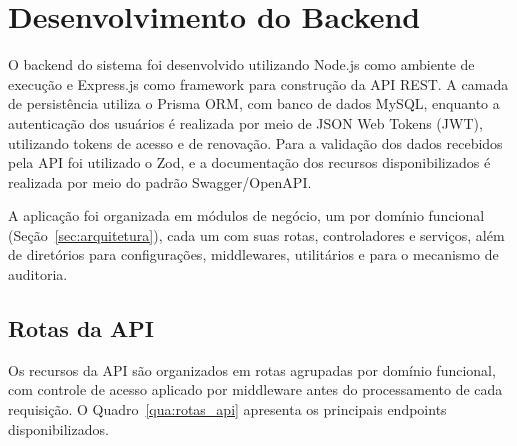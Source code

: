 \section{Desenvolvimento do Backend}\label{sec:backend}

O backend do sistema foi desenvolvido utilizando Node.js como ambiente de execução e Express.js como framework para construção da API REST. A camada de persistência utiliza o Prisma ORM, com banco de dados MySQL, enquanto a autenticação dos usuários é realizada por meio de JSON Web Tokens (JWT), utilizando tokens de acesso e de renovação. Para a validação dos dados recebidos pela API foi utilizado o Zod, e a documentação dos recursos disponibilizados é realizada por meio do padrão Swagger/OpenAPI.

A aplicação foi organizada em módulos de negócio, um por domínio funcional (Seção~\ref{sec:arquitetura}), cada um com suas rotas, controladores e serviços, além de diretórios para configurações, middlewares, utilitários e para o mecanismo de auditoria.

\subsection{Rotas da API}

Os recursos da API são organizados em rotas agrupadas por domínio funcional, com controle de acesso aplicado por middleware antes do processamento de cada requisição. O Quadro~\ref{qua:rotas_api} apresenta os principais endpoints disponibilizados.

